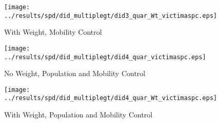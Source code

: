 \documentclass[11pt,letterpaper]{article}
\begin{document}
\begin{figure}[H]
\caption{With Weight, Mobility Control}
\centering
\texttt{[image: ../results/spd/did\_multiplegt/did3\_quar\_Wt\_victimaspc.eps]}
\end{figure}
\begin{figure}[H]
\caption{No Weight, Population and Mobility Control}
\centering
\texttt{[image: ../results/spd/did\_multiplegt/did4\_quar\_victimaspc.eps]}
\end{figure}

\begin{figure}[H]
\caption{With Weight, Population and Mobility Control}
\centering
\texttt{[image: ../results/spd/did\_multiplegt/did4\_quar\_Wt\_victimaspc.eps]}
\end{figure}
\end{document}
